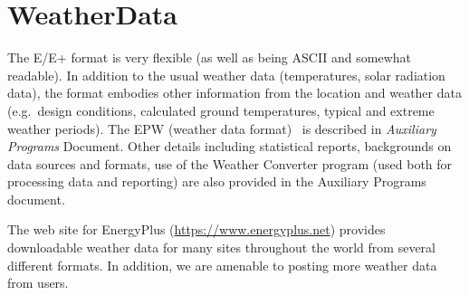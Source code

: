 \section{WeatherData}\label{weatherdata}

The E/E+ format is very flexible (as well as being ASCII and somewhat readable). In addition to the usual weather data (temperatures, solar radiation data), the format embodies other information from the location and weather data (e.g.~design conditions, calculated ground temperatures, typical and extreme weather periods). The EPW (weather data format)~ is described in \emph{Auxiliary Programs} Document. Other details including statistical reports, backgrounds on data sources and formats, use of the Weather Converter program (used both for processing data and reporting) are also provided in the Auxiliary Programs document.

The web site for EnergyPlus (\url{https://www.energyplus.net}) provides downloadable weather data for many sites throughout the world from several different formats. In addition, we are amenable to posting more weather data from users.
